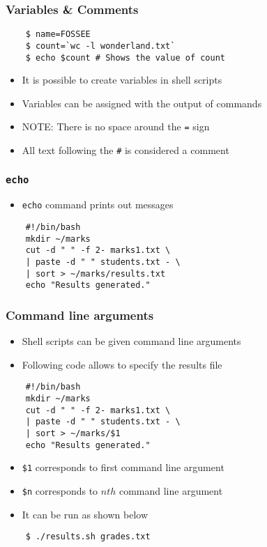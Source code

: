 \documentclass[12pt,compress]{beamer}
\begin{document}
\begin{frame}[fragile]
  \frametitle{Variables \& Comments}
  \begin{lstlisting}
    $ name=FOSSEE
    $ count=`wc -l wonderland.txt`
    $ echo $count # Shows the value of count
  \end{lstlisting} %
  \begin{itemize}
  \item It is possible to create variables in shell scripts
  \item Variables can be assigned with the output of commands
  \item \alert{NOTE:} There is no space around the \texttt{=} sign
  \item All text following the \texttt{\#} is considered a comment
  \end{itemize}
\end{frame}

\begin{frame}[fragile]
  \frametitle{\texttt{echo}}
  \begin{itemize}
  \item \texttt{echo} command prints out messages
  \end{itemize}
  \begin{lstlisting}
    #!/bin/bash
    mkdir ~/marks
    cut -d " " -f 2- marks1.txt \
    | paste -d " " students.txt - \
    | sort > ~/marks/results.txt
    echo "Results generated."
  \end{lstlisting} %
\end{frame}

\begin{frame}[fragile]
  \frametitle{Command line arguments}
  \begin{itemize}
  \item Shell scripts can be given command line arguments
  \item Following code allows to specify the results file
  \end{itemize}
  \begin{lstlisting}
    #!/bin/bash
    mkdir ~/marks
    cut -d " " -f 2- marks1.txt \
    | paste -d " " students.txt - \
    | sort > ~/marks/$1
    echo "Results generated."
  \end{lstlisting} %
  \begin{itemize}
  \item \texttt{\$1} corresponds to first command line argument 
  \item \texttt{\$n} corresponds to $n{th}$ command line argument
  \item It can be run as shown below
  \end{itemize}
  \begin{lstlisting}
    $ ./results.sh grades.txt
  \end{lstlisting} %
\end{frame}
\end{document}
